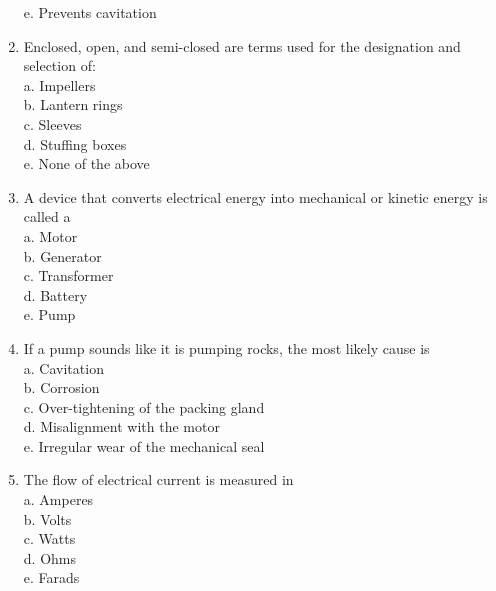 \documentclass{article}
\begin{document}
\begin{enumerate}[1.]
e. Prevents cavitation\\

\item Enclosed, open, and semi-closed are terms used for the designation and selection of:\\

a. Impellers\\

b. Lantern rings\\

c. Sleeves\\

d. Stuffing boxes\\

e. None of the above \\

\item A device that converts electrical energy into mechanical or kinetic energy is called a\\

a. Motor\\

b. Generator\\

c. Transformer\\

d. Battery\\

e. Pump\\

\item If a pump sounds like it is pumping rocks, the most likely cause is\\
a. Cavitation\\

b. Corrosion\\

c. Over-tightening of the packing gland\\

d. Misalignment with the motor\\

e. Irregular wear of the mechanical seal\\

\item The flow of electrical current is measured in\\
a. Amperes\\
b. Volts\\
c. Watts\\
d. Ohms\\
e. Farads\\


\end{enumerate}
\end{document}
